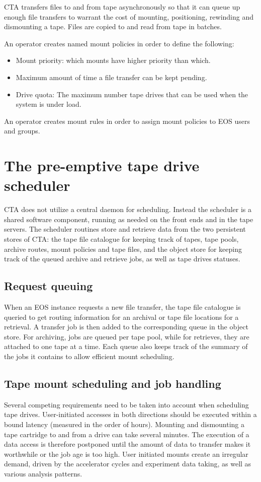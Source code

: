 \documentclass[a4paper]{jpconf}
\begin{document}
CTA transfers files to and from tape asynchronously so that it can queue up
enough file transfers to warrant the cost of mounting, positioning, rewinding
and dismounting a tape.  Files are copied to and read from tape in batches.

An operator creates named mount policies in order to define the following:
\begin{itemize}
  \item Mount priority: which mounts have higher priority than which.
  \item Maximum amount of time a file transfer can be kept pending.
  \item Drive quota: The maximum number tape drives that can be used when the
  system is under load.
\end{itemize}

An operator creates mount rules in order to assign mount policies to EOS users
and groups. 

\section{The pre-emptive tape drive scheduler} \label{scheduler}
CTA does not utilize a central daemon for scheduling. Instead the scheduler is a
shared software component, running as needed on the front ends and in the tape
servers. The scheduler routines store and retrieve data from the two persistent
stores of CTA: the tape file catalogue for keeping track of tapes, tape pools,
archive routes, mount policies and tape files, and the object store for keeping
track of the queued archive and retrieve jobs, as well as tape drives statuses.

\subsection{Request queuing}
When an EOS instance requests a new file transfer, the tape file catalogue is
queried to get routing information for an archival or tape file locations for a
retrieval. A transfer job is then added to the corresponding queue in the object
store. For archiving, jobs are queued per tape pool, while for retrieves, they
are attached to one tape at a time. Each queue also keeps track of the summary
of the jobs it contains to allow efficient mount scheduling.

\subsection{Tape mount scheduling and job handling}
Several competing requirements need to be taken into account when scheduling tape
drives.  User-initiated accesses in both directions should be executed within a
bound latency (measured in the order of hours). Mounting and dismounting a tape
cartridge to and from a drive can take several minutes.  The execution of a data
access is therefore postponed until the amount of data to transfer makes it
worthwhile or the job age is too high. User initiated mounts create an irregular
demand, driven by the accelerator cycles and experiment data taking, as well as
various analysis patterns.
\end{document}
